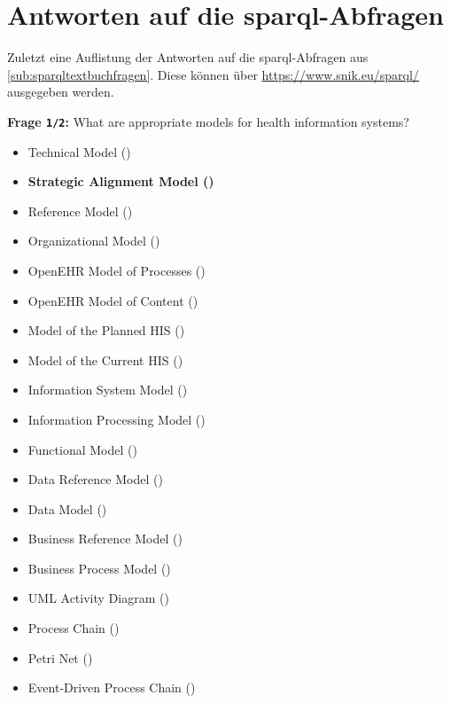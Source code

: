 \section[Antworten auf die SPARQL-Abfragen]{Antworten auf die \ac{sparql}-Abfragen}\label{sub:antwortentextbuch}

Zuletzt eine Auflistung der Antworten auf die \ac{sparql}-Abfragen aus \cref{sub:sparqltextbuchfragen}.
Diese können über \url{https://www.snik.eu/sparql/} ausgegeben werden.

\textbf{Frage \texttt{1/2}:} What are appropriate models for health information systems?

\begin{itemize}
  \item Technical Model ()
  \item \textbf{ Strategic Alignment Model ()}
  \item Reference Model ()
  \item Organizational Model ()
  \item OpenEHR Model of Processes ()
  \item OpenEHR Model of Content ()
  \item Model of the Planned HIS ()
  \item Model of the Current HIS ()
  \item Information System Model ()
  \item Information Processing Model ()
  \item Functional Model ()
  \item Data Reference Model ()
  \item Data Model ()
  \item Business Reference Model ()
  \item Business Process Model ()
  \item UML Activity Diagram ()
  \item Process Chain ()
  \item Petri Net ()
  \item Event-Driven Process Chain ()

\end{itemize}
